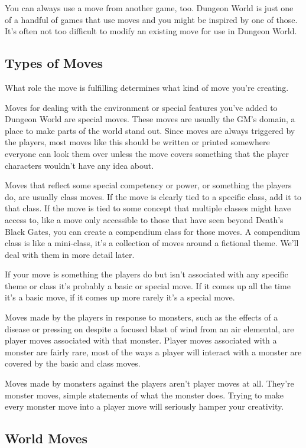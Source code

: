 You can always use a move from another game, too. Dungeon World is just one of a handful of games that use moves and you might be inspired by one of those. It's often not too difficult to modify an existing move for use in Dungeon World.
\subsection{Types of Moves}


What role the move is fulfilling determines what kind of move you're creating.


Moves for dealing with the environment or special features you've added to Dungeon World are special moves. These moves are usually the GM's domain, a place to make parts of the world stand out. Since moves are always triggered by the players, most moves like this should be written or printed somewhere everyone can look them over unless the move covers something that the player characters wouldn't have any idea about.


Moves that reflect some special competency or power, or something the players do, are usually class moves. If the move is clearly tied to a specific class, add it to that class. If the move is tied to some concept that multiple classes might have access to, like a move only accessible to those that have seen beyond Death's Black Gates, you can create a compendium class for those moves. A compendium class is like a mini-class, it's a collection of moves around a fictional theme. We'll deal with them in more detail later.


If your move is something the players do but isn't associated with any specific theme or class it's probably a basic or special move. If it comes up all the time it's a basic move, if it comes up more rarely it's a special move.


Moves made by the players in response to monsters, such as the effects of a disease or pressing on despite a focused blast of wind from an air elemental, are player moves associated with that monster. Player moves associated with a monster are fairly rare, most of the ways a player will interact with a monster are covered by the basic and class moves.


Moves made by monsters against the players aren't player moves at all. They're monster moves, simple statements of what the monster does. Trying to make every monster move into a player move will seriously hamper your creativity.
\subsection{World Moves}


